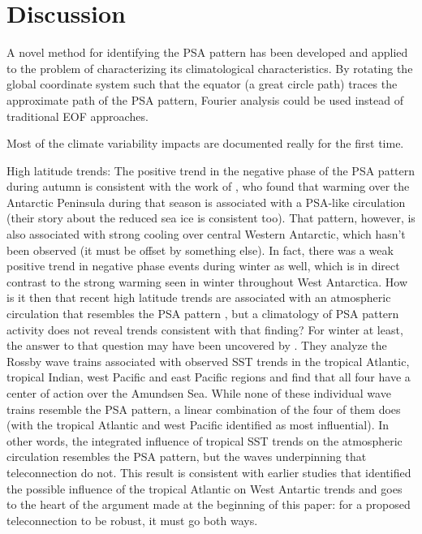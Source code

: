 \section{Discussion}

A novel method for identifying the PSA pattern has been developed and applied to the problem of characterizing its climatological characteristics. By rotating the global coordinate system such that the equator (a great circle path) traces the approximate path of the PSA pattern, Fourier analysis could be used instead of traditional EOF approaches.   

Most of the climate variability impacts are documented really for the first time.

High latitude trends: The positive trend in the negative phase of the PSA pattern during autumn is consistent with the work of \citet{Ding2013}, who found that warming over the Antarctic Peninsula during that season is associated with a PSA-like circulation (their story about the reduced sea ice is consistent too). That pattern, however, is also associated with strong cooling over central Western Antarctic, which hasn't been observed (it must be offset by something else). In fact, there was a weak positive trend in negative phase events during winter as well, which is in direct contrast to the strong warming seen in winter throughout West Antarctica. How is it then that recent high latitude trends are associated with an atmospheric circulation that resembles the PSA pattern \citep{Ding2011}, but a climatology of PSA pattern activity does not reveal trends consistent with that finding? For winter at least, the answer to that question may have been uncovered by \citet{Li2015a}. They analyze the Rossby wave trains associated with observed SST trends in the tropical Atlantic, tropical Indian, west Pacific and east Pacific regions and find that all four have a center of action over the Amundsen Sea. While none of these individual wave trains resemble the PSA pattern, a linear combination of the four of them does (with the tropical Atlantic and west Pacific identified as most influential). In other words, the integrated influence of tropical SST trends on the atmospheric circulation resembles the PSA pattern, but the waves underpinning that teleconnection do not. This result is consistent with earlier studies that identified the possible influence of the tropical Atlantic on West Antartic trends \citep{Li2014,Simpkins2014} and goes to the heart of the argument made at the beginning of this paper: for a proposed teleconnection to be robust, it must go both ways. 

